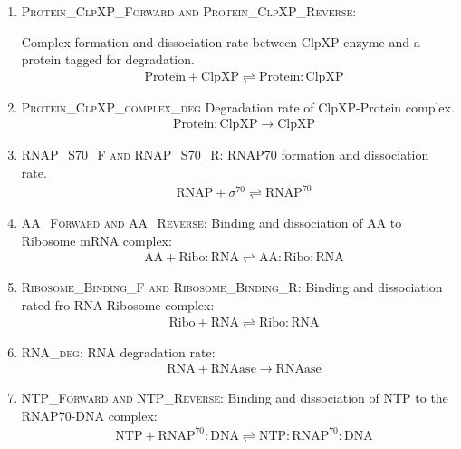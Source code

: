 \documentclass[english]{report}
\begin{document}
\begin{enumerate}
        	\item \textsc{Protein\_ClpXP\_Forward and Protein\_ClpXP\_Reverse}: 
        	
        	Complex formation and dissociation rate between ClpXP enzyme and a protein tagged for degradation.
        	\begin{align}
        	& \mathrm{Protein} + \mathrm{ClpXP} \rightleftharpoons  \mathrm{Protein:ClpXP} 
        	\end{align}        	
        	\item \textsc{Protein\_ClpXP\_complex\_deg} 
        	Degradation rate of ClpXP-Protein complex.
        	\begin{align}
        	& \mathrm{Protein:ClpXP}  \rightarrow   \mathrm{ClpXP}
        	\end{align} 
        	\item \textsc{RNAP\_S70\_F and RNAP\_S70\_R}:
        	RNAP70 formation and dissociation rate.
        	\begin{align}
        	& \mathrm{RNAP} + \sigma^{70} \rightleftharpoons   \mathrm{RNAP^{70}}
        	\end{align}
        	\item \textsc{AA\_Forward and AA\_Reverse}:
        	Binding and dissociation of AA to Ribosome mRNA complex:
        	\begin{align}
        	& \mathrm{AA} + \mathrm{Ribo:RNA}  \rightleftharpoons   \mathrm{AA}:\mathrm{Ribo:RNA}
        	\end{align}
        	\item \textsc{Ribosome\_Binding\_F and Ribosome\_Binding\_R}: Binding and dissociation rated fro RNA-Ribosome complex:
        	\begin{align}
        	& \mathrm{Ribo} + \mathrm{RNA}  \rightleftharpoons   \mathrm{Ribo:RNA}
        	\end{align}
        	\item \textsc{RNA\_deg}: RNA degradation rate:
        	\begin{align}
        	& \mathrm{RNA} + \mathrm{RNAase}  \rightarrow   \mathrm{RNAase}
        	\end{align}
        	
        	\item \textsc{NTP\_Forward and NTP\_Reverse}:
        	Binding and dissociation of NTP to the RNAP70-DNA complex:
        	\begin{align}
        	& \mathrm{NTP} + \mathrm{RNAP^{70}}:\mathrm{DNA}  \rightleftharpoons   \mathrm{NTP}:\mathrm{RNAP^{70}}:\mathrm{DNA}
        	\end{align}
			\end{enumerate}		
\end{document}
